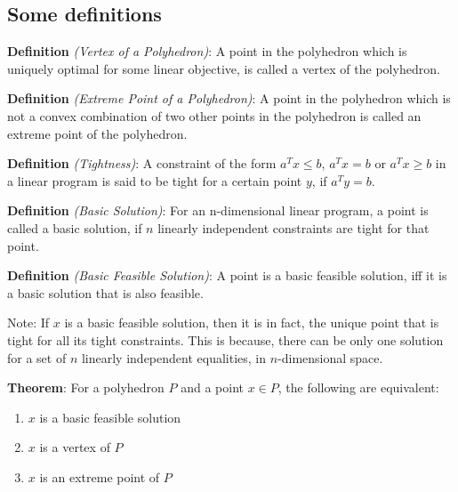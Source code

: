 \documentclass[11pt]{article}
\begin{document}
\subsection{Some definitions}

\textbf{Definition}
\emph{(Vertex of a Polyhedron)}:
A point in the polyhedron which is uniquely optimal for some linear objective, is called a vertex of the polyhedron.

\textbf{Definition}
\emph{(Extreme Point of a Polyhedron)}:
A point in the polyhedron which is not a convex combination of two other points in the polyhedron is called an extreme point of the polyhedron.

\textbf{Definition}
\emph{(Tightness)}:
A constraint of the form $a^Tx \leq b$, $a^Tx=b$ or $a^Tx \geq b$ in a linear program is said to be tight for a certain point $y$, if $a^Ty=b$.

\textbf{Definition}
\emph{(Basic Solution)}:
For an n-dimensional linear program, a point is called a basic solution, if $n$ linearly independent constraints are tight for that point.

\textbf{Definition}
\emph{(Basic Feasible Solution)}:
A point is a basic feasible solution, iff it is a basic solution that is also feasible.

Note: If $x$ is a basic feasible solution, then it is in fact, the unique point that is tight for all its tight constraints. This is because, there can be only one solution for a set of $n$ linearly independent equalities, in $n$-dimensional space.

\textbf{Theorem}: For a polyhedron $P$ and a point $x\in P$, the following are equivalent:
\begin{enumerate}
\item $x$ is a basic feasible solution
\item $x$ is a vertex of $P$
\item $x$ is an extreme point of $P$
\end{enumerate}
\end{document}
